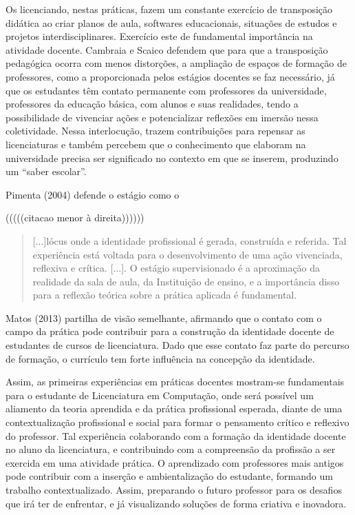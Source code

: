     
    Os licenciando, nestas práticas, fazem um constante exercício de transposição didática ao criar planos de aula, softwares educacionais, situações de estudos e projetos interdisciplinares. Exercício este de fundamental importância na atividade docente. Cambraia e Scaico defendem que para que a transposição pedagógica ocorra com menos distorções, a ampliação de espaços de formação de professores, como a proporcionada pelos estágios docentes se faz necessário, já que os estudantes têm contato permanente com professores da universidade, professores da educação básica, com alunos e suas realidades, tendo a possibilidade de vivenciar ações e potencializar reflexões em imersão nessa coletividade. Nessa interlocução, trazem contribuições para repensar as licenciaturas e também percebem que o conhecimento que elaboram na universidade precisa ser significado no contexto em que se inserem, produzindo um “saber escolar”.
 
	Pimenta (2004) defende o estágio como o 

(((((citacao menor à direita))))))
\begin{quotation} 
[...]lócus onde a identidade profissional é gerada, construída e referida. Tal experiência está voltada para o desenvolvimento de uma ação vivenciada, reflexiva e crítica. [...]. O estágio supervisionado é a aproximação da realidade da sala de aula, da Instituição de ensino, e a importância disso para a reflexão teórica sobre a prática aplicada é fundamental.
\end{quotation}
 
Matos (2013) partilha de visão semelhante, afirmando que o contato com o campo da prática pode contribuir para a construção da identidade docente de estudantes de cursos de licenciatura. Dado que esse contato faz parte do percurso de formação, o currículo tem forte influência na concepção da identidade.


	Assim, as primeiras experiências em práticas docentes mostram-se fundamentais para o estudante de Licenciatura em Computação, onde será possível um aliamento da teoria aprendida e da prática profissional esperada, diante de uma contextualização profissional e social para formar o pensamento crítico e reflexivo do professor. Tal experiência colaborando com a formação da identidade docente no aluno da licenciatura, e contribuindo com a compreensão da profissão a ser exercida em uma atividade prática. O aprendizado com professores mais antigos pode contribuir com a inserção e ambientalização do estudante, formando um trabalho contextualizado. Assim, preparando o futuro professor para os desafios que irá ter de enfrentar, e já visualizando soluções de forma criativa e inovadora.